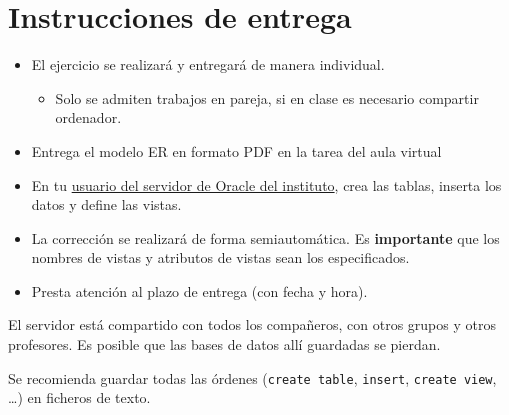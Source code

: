\documentclass[a4paper]{article}
\begin{document}
\section{Instrucciones de entrega}
\label{sec:org0000012}
\begin{itemize}
\item El ejercicio se realizará y entregará de manera individual.
\begin{itemize}
\item Solo se admiten trabajos en pareja, si en clase es necesario compartir ordenador.
\end{itemize}
\item Entrega el modelo ER en formato PDF en la tarea del aula virtual
\item En tu \href{https://aulavirtual3.educa.madrid.org/ies.alonsodeavellan.alcala/mod/assign/view.php?id=29534}{usuario del servidor de Oracle del instituto}, crea las tablas, inserta los datos y define las vistas.
\item La corrección se realizará de forma semiautomática. Es \textbf{importante} que los nombres de vistas y atributos de vistas sean los especificados.
\item Presta atención al plazo de entrega (con fecha y hora).
\end{itemize}


\begin{Aviso}
El servidor está compartido con todos los compañeros, con otros grupos y otros profesores. Es posible que las bases de datos allí guardadas se pierdan.

Se recomienda guardar todas las órdenes (\texttt{create table}, \texttt{insert}, \texttt{create view}, \ldots) en ficheros de texto.
\end{Aviso}
\end{document}
